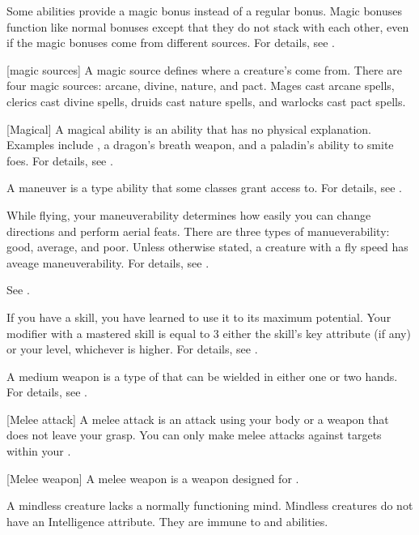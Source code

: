  Some abilities provide a magic bonus instead of a regular bonus.
Magic bonuses function like normal bonuses except that they do not stack with each other, even if the magic bonuses come from different sources.
For details, see .

[magic sources] A magic source defines where a creature's  come from.
There are four magic sources: arcane, divine, nature, and pact.
Mages cast arcane spells, clerics cast divine spells, druids cast nature spells, and warlocks cast pact spells.

[Magical] A magical ability is an ability that has no physical explanation.
Examples include , a dragon's breath weapon, and a paladin's ability to smite foes.
For details, see .

 A maneuver is a type  ability that some classes grant access to.
For details, see .

 While flying, your maneuverability determines how easily you can change directions and perform aerial feats.
There are three types of manueverability: good, average, and poor.
Unless otherwise stated, a creature with a fly speed has aveage maneuverability.
For details, see .

 See .

 If you have  a skill, you have learned to use it to its maximum potential.
Your modifier with a mastered skill is equal to 3 \add either the skill's key attribute (if any) or your level, whichever is higher.
For details, see .

 A medium weapon is a type of  that can be wielded in either one or two hands.
For details, see .

[Melee attack] A melee attack is an attack using your body or a weapon that does not leave your grasp.
You can only make melee attacks against targets within your .

[Melee weapon] A melee weapon is a weapon designed for .

 A mindless creature lacks a normally functioning mind.
Mindless creatures do not have an Intelligence attribute.
They are immune to  and  abilities.

